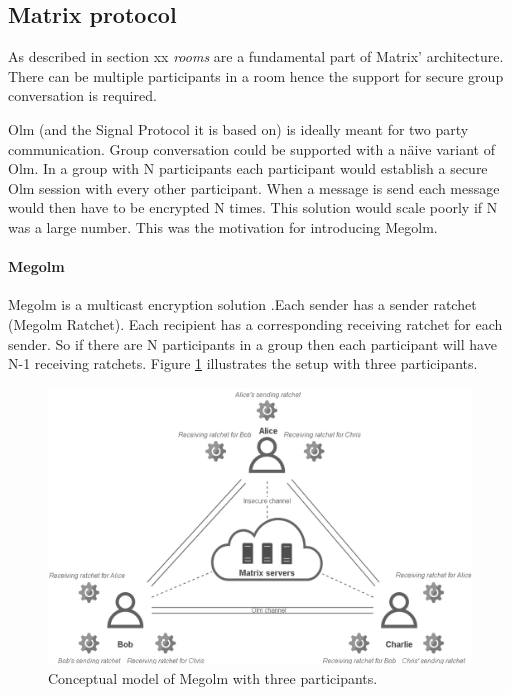 \subsection{Matrix protocol}\label{matrixeval}

As described in section xx \emph{rooms} are a fundamental part of Matrix' architecture. There can be multiple participants in a room hence the support for secure group conversation is required. 

Olm (and the Signal Protocol it is based on) is ideally meant for two party communication.
Group conversation could be supported with a näive variant of Olm. In a group with N participants each participant would establish a secure Olm session with every other participant. When a message is send each message would then have to be encrypted N times. This solution would scale poorly if N was a large number. This was the motivation for introducing Megolm.

\paragraph{Megolm}

Megolm is a multicast encryption solution \cite{sok}.Each sender has a sender ratchet (Megolm Ratchet). Each recipient has a corresponding receiving ratchet for each sender. So if there are N participants in a group then each participant will have N-1 receiving ratchets. Figure \ref{fig:megolm} illustrates the setup with three participants. 

\begin{figure}[H]
	\hspace*{-1cm} 
	\centering
	\includegraphics[width=14cm]{figures/megolm_conceptual.png}
	\caption{Conceptual model of Megolm with three participants.}
	\label{fig:megolm}
\end{figure}

